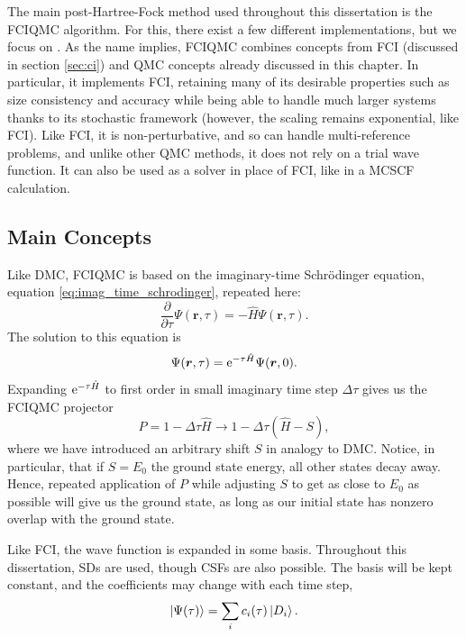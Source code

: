 The main post-Hartree-Fock method used throughout this dissertation is the \gls{FCIQMC} algorithm.
\supercite{boothFermion2009}
For this, there exist a few different implementations,
\supercite{gutherNECI2020,spencerHANDEQMC2019,brandRimujl2024,andersonRobertanderson2024} but we focus on \neci.
\supercite{gutherNECI2020} As the name implies, \gls{FCIQMC} combines concepts from \gls{FCI} (discussed in section \ref{sec:ci}) and \gls{QMC} concepts already discussed in this chapter. In particular, it implements FCI, retaining many of its desirable properties such as size consistency and accuracy while being able to handle much larger systems thanks to its stochastic framework (however, the scaling remains exponential, like FCI). Like FCI, it is non-perturbative, and so can handle multi-reference problems, and unlike other QMC methods, it does not rely on a trial wave function. It can also be used as a solver in place of FCI, like in a \gls{MCSCF} calculation.\supercite{dobrautzSpinPure2021,weserStochastic2022}

\subsection{Main Concepts}

Like \gls{DMC}, \gls{FCIQMC} is based on the imaginary-time Schr\"odinger equation, equation \ref{eq:imag_time_schrodinger}, repeated here:
\begin{equation}
    \frac{\partial}{\partial\tau}\Psi(\bm r, \tau) = -\hat H\Psi(\bm r, \tau).
\end{equation}
The solution to this equation is
\begin{equation}
    \Psi(\bm r, \tau) = \mathrm{e}^{-\tau\hat H}\Psi(\bm r, 0).
\end{equation}
Expanding $\mathrm{e}^{-\tau\hat H}$ to first order in small imaginary time step $\Delta\tau$ gives us the FCIQMC projector
\begin{equation}
    \label{eq:fciqmc_projector}
    P = 1-\Delta\tau\hat H \to 1-\Delta\tau(\hat H - S),
\end{equation}
where we have introduced an arbitrary shift $S$ in analogy to \gls{DMC}. Notice, in particular, that if $S=E_0$ the ground state energy, all other states decay away. Hence, repeated application of $P$ while adjusting $S$ to get as close to $E_0$ as possible will give us the ground state, as long as our initial state has nonzero overlap with the ground state.

Like \gls{FCI}, the wave function is expanded in some basis. Throughout this dissertation, \glspl{SD} are used, though \glspl{CSF} are also possible.\supercite{dobrautzEfficient2019} The basis will be kept constant, and the coefficients may change with each time step,
\begin{equation}
    \ket{\Psi(\tau)} = \sum_i c_i(\tau)\ket{D_i}.
\end{equation}

